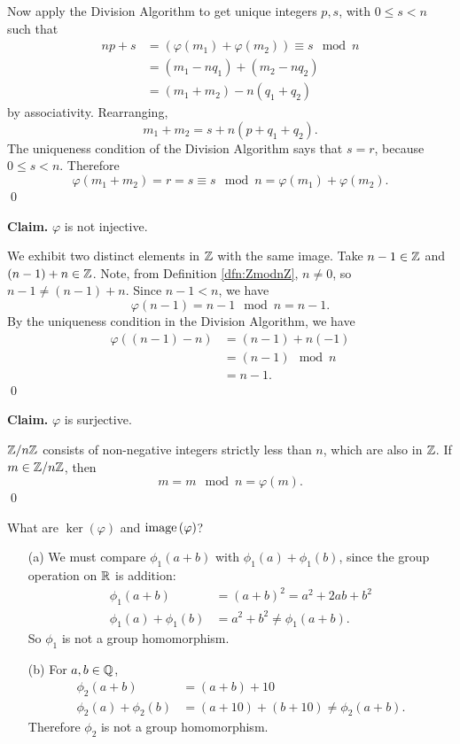 \documentclass[../algebraNotesMSRI-UP2016.tex]{subfiles}
\begin{document}
\begin{frame}{}{}
Now apply the Division Algorithm to get unique integers $p,s$, with $0\leq s<n$ such that
\begin{align*}
np+s &= \left(\varphi(m_1)+\varphi(m_2)\right)\equiv s\mod n \\
	&= (m_1-nq_1)+(m_2-nq_2) \\
	&= (m_1+m_2)-n(q_1+q_2)
\end{align*}
by associativity.  Rearranging,
\[
m_1+m_2 = s+n(p+q_1+q_2).
\]
The uniqueness condition of the Division Algorithm says that $s=r$, because $0\leq s<n$.  Therefore
\[
\varphi(m_1+m_2)=r=s\equiv s\mod n=\varphi(m_1)+\varphi(m_2).
\]
\qed
\end{frame}

\begin{frame}[c]
\textbf{Claim.} $\varphi$ is not injective.

\smallGap
\pf
We exhibit two distinct elements in $\mathbb Z$ with the same image.  Take $n-1\in\mathbb Z$ and $(n-1)+n\in\mathbb Z$.  Note, from Definition \ref{dfn:ZmodnZ}, $n\neq 0$, so $n-1\neq (n-1)+n$.  Since $n-1<n$, we have
\[
\varphi{(n-1)}=n-1\mod n=n-1.
\]
By the uniqueness condition in the Division Algorithm, we have
\begin{align*}
\varphi{\left((n-1)-n\right)} &= (n-1)+n(-1) \\
	&= (n-1)\mod n \\
	&= n-1.
\end{align*}
\qed
\end{frame}

\begin{frame}[c]
\textbf{Claim.} $\varphi$ is surjective.

\smallGap
\pf
$\mathbb Z/n\mathbb Z$ consists of non-negative integers strictly less than $n$, which are also in $\mathbb Z$.  If $m\in\mathbb Z/n\mathbb Z$, then 
\[
m=m\mod n=\varphi(m).
\]
\qed
\begin{que}
What are $\ker{(\varphi)}$ and $\operatorname{image}{(\varphi)}$?
\end{que}
\end{frame}

\answerKey
\begin{frame}{\subsecname}
\begin{itemize}
\item[(a)] We must compare $\phi_1(a+b)$ with $\phi_1(a)+\phi_1(b)$, since the group operation on $\mathbb R$ is addition:
\begin{align*}
\phi_1(a+b) &= (a+b)^2 = a^2+2ab+b^2 \\
\phi_1(a)+\phi_1(b) &= a^2+b^2\neq \phi_1(a+b).
\end{align*}
So $\phi_1$ is not a group homomorphism.

\smallGap
\item[(b)] For $a,b\in \mathbb Q$,
\begin{align*}
\phi_2(a+b) &= (a+b)+10 \\
\phi_2(a)+\phi_2(b) &= (a+10)+(b+10) \neq \phi_2(a+b).
\end{align*}
Therefore $\phi_2$ is not a group homomorphism.
\end{itemize}
\end{frame}
\end{document}
